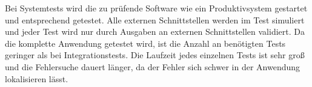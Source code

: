 Bei Systemtests wird die zu prüfende Software wie ein Produktivsystem
gestartet und entsprechend getestet. 
Alle externen Schnittstellen werden im Test simuliert und jeder Test wird nur durch Ausgaben an externen Schnittstellen validiert.
Da die komplette Anwendung getestet wird, ist die Anzahl an benötigten Tests geringer als bei Integrationstests. 
Die Laufzeit jedes einzelnen Tests ist sehr groß 
und die Fehlersuche dauert länger, da der Fehler sich schwer in der Anwendung lokalisieren lässt.